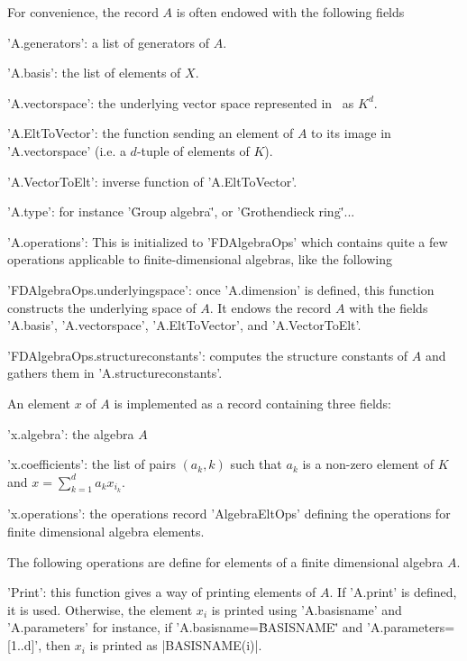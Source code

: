 For  convenience,  the  record  $A$  is  often  endowed  with the following
fields\:

'A.generators': a list of generators of $A$.

'A.basis':  the list of elements of $X$.

'A.vectorspace': the underlying vector space represented in \GAP\ as $K^d$.

'A.EltToVector':  the function sending an element of $A$ to its image in
'A.vectorspace' (i.e. a $d$-tuple of elements of $K$).

'A.VectorToElt': inverse function of 'A.EltToVector'.

'A.type': for instance '\"Group algebra\"', or '\"Grothendieck ring\"'...

'A.operations': This is initialized to 'FDAlgebraOps' which contains
  quite a few operations applicable to finite-dimensional algebras, like the
  following\:

'FDAlgebraOps.underlyingspace':  once 'A.dimension' is defined, this function
constructs  the underlying space of $A$. It  endows the record $A$ with the
fields 'A.basis', 'A.vectorspace', 'A.EltToVector', and 'A.VectorToElt'.

'FDAlgebraOps.structureconstants':  computes the structure constants
of $A$ and gathers them in 'A.structureconstants'.


An element $x$ of $A$ is implemented as a record containing three fields:

'x.algebra': the algebra $A$

'x.coefficients': the list of pairs $(a_k,k)$ such that $a_k$ is a non-zero
element of $K$ and $x=\sum_{k=1}^d a_k x_{i_k}$.

'x.operations':   the  operations   record  'AlgebraEltOps'   defining  the
operations for finite dimensional algebra elements.


The  following operations are  define for elements  of a finite dimensional
algebra $A$.

'Print':  this  function  gives  a  way  of  printing  elements  of $A$. If
'A.print'  is defined, it is used.  Otherwise, the element $x_i$ is printed
using 'A.basisname' and 'A.parameters'\: for instance, if
'A.basisname\:=\"BASISNAME\"'  and  'A.parameters\:=[1..d]',  then $x_i$ is
printed as |BASISNAME(i)|.

